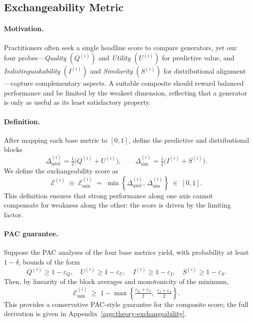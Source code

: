 \subsection{Exchangeability Metric}
\label{sec:exchangeability}

\paragraph{Motivation.}
Practitioners often seek a single headline score to compare generators, yet
our four probes—\emph{Quality} $(Q^{(i)})$ and \emph{Utility} $(U^{(i)})$ for predictive value, and
\emph{Indistinguishability} $(I^{(i)})$ and \emph{Similarity} $(S^{(i)})$ for distributional alignment—capture
complementary aspects. A suitable composite should reward balanced performance
and be limited by the weakest dimension, reflecting that a generator is only as
useful as its least satisfactory property.

\paragraph{Definition.}
After mapping each base metric to $[0,1]$, define the predictive and
distributional blocks
\[
\Delta_{\mathrm{qual}}^{(i)} = \tfrac12\bigl(Q^{(i)}+U^{(i)}\bigr),
\qquad
\Delta_{\mathrm{sim}}^{(i)} = \tfrac12\bigl(I^{(i)}+S^{(i)}\bigr).
\]
We define the exchangeability score as
\[
\mathcal{E}^{(i)} \;\equiv\;
\mathcal{E}_{\min}^{(i)} \;=\;
\min\!\left\{\Delta_{\mathrm{qual}}^{(i)},\,
\Delta_{\mathrm{sim}}^{(i)}\right\}
\;\in\; [0,1].
\]
This definition ensures that strong performance along one axis cannot compensate
for weakness along the other: the score is driven by the limiting factor.

\paragraph{PAC guarantee.}
Suppose the PAC analyses of the four base metrics yield, with probability at
least $1-\delta$, bounds of the form
\[
Q^{(i)} \ge 1-\varepsilon_Q,\quad
U^{(i)} \ge 1-\varepsilon_U,\quad
I^{(i)} \ge 1-\varepsilon_I,\quad
S^{(i)} \ge 1-\varepsilon_S.
\]
Then, by linearity of the block averages and monotonicity of the minimum,
\[
\mathcal{E}_{\min}^{(i)}
\;\ge\;
1-\max\!\left\{
\tfrac{\varepsilon_Q+\varepsilon_U}{2},\;
\tfrac{\varepsilon_I+\varepsilon_S}{2}
\right\}.
\]
This provides a conservative PAC-style guarantee for the composite score; the
full derivation is given in Appendix~\ref{app:theory-exchangeability}.

